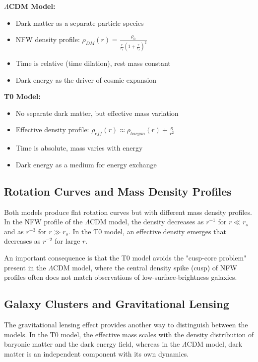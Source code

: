 \documentclass[a4paper,12pt]{article}
\begin{document}
\begin{tcolorbox}[colback=green!5!white,colframe=green!75!black,title=Comparison of Models]
	\textbf{$\Lambda$CDM Model:}
	\begin{itemize}
		\item Dark matter as a separate particle species
		\item NFW density profile: $\rho_{DM}(r) = \frac{\rho_0}{\frac{r}{r_s}(1 + \frac{r}{r_s})^2}$
		\item Time is relative (time dilation), rest mass constant
		\item Dark energy as the driver of cosmic expansion
	\end{itemize}
	
	\textbf{T0 Model:}
	\begin{itemize}
		\item No separate dark matter, but effective mass variation
		\item Effective density profile: $\rho_{eff}(r) \approx \rho_{baryon}(r) + \frac{\kappa}{r^2}$
		\item Time is absolute, mass varies with energy
		\item Dark energy as a medium for energy exchange
	\end{itemize}
\end{tcolorbox}

\subsection{Rotation Curves and Mass Density Profiles}

Both models produce flat rotation curves but with different mass density profiles. In the NFW profile of the $\Lambda$CDM model, the density decreases as $r^{-1}$ for $r \ll r_s$ and as $r^{-3}$ for $r \gg r_s$. In the T0 model, an effective density emerges that decreases as $r^{-2}$ for large $r$.

An important consequence is that the T0 model avoids the "cusp-core problem" present in the $\Lambda$CDM model, where the central density spike (cusp) of NFW profiles often does not match observations of low-surface-brightness galaxies.

\subsection{Galaxy Clusters and Gravitational Lensing}

The gravitational lensing effect provides another way to distinguish between the models. In the T0 model, the effective mass scales with the density distribution of baryonic matter and the dark energy field, whereas in the $\Lambda$CDM model, dark matter is an independent component with its own dynamics.
\end{document}
